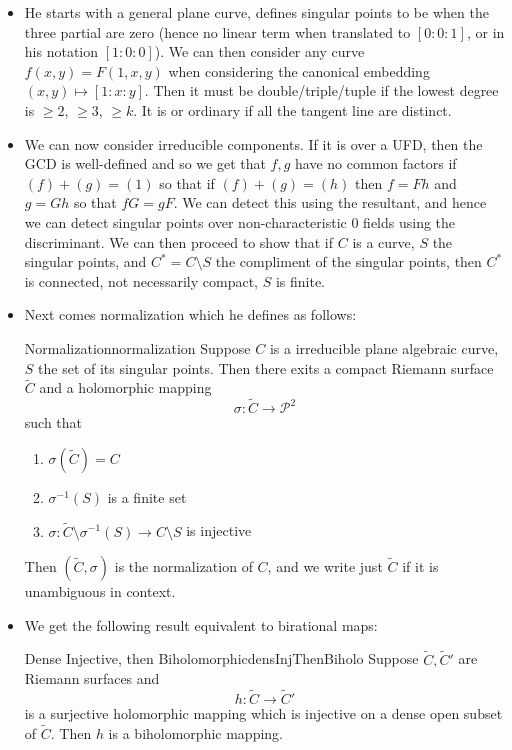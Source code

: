 \documentclass{book}
\newcommand{\CP}{{\mathcal{P}}}
\begin{document}
\begin{itemize}
  \item He starts with a general plane curve, defines singular points to be when the three partial are zero
    (hence no linear term when translated to $[0:0:1]$, or in his notation $[1:0:0]$). We can then consider
    any curve $f(x,y) = F(1,x,y)$ when considering the canonical embedding $(x,y) \mapsto [1:x:y]$. Then it
    must be double/triple/tuple if the lowest degree is $\ge 2$, $\ge 3$, $\ge k$. It is or ordinary if all
    the tangent line are distinct.
    \item We can now consider irreducible components. If it is over a UFD, then the GCD is well-defined and so
      we get that $f,g$ have no common factors if $(f) + (g) = (1)$ so that if $(f) + (g) = (h)$ then $f = Fh$
      and $g = Gh$ so that $fG = gF$. We can detect this using the resultant, and hence we can detect singular
      points over non-characteristic $0$ fields using the discriminant. We can then proceed to show that if
      $C$ is a curve, $S$ the singular points, and $C^* = C\setminus S$ the compliment of the singular points,
      then $C^*$ is connected, not necessarily compact, $S$ is finite.
      \item Next comes normalization which he defines as follows:
        \begin{defn}{Normalization}{normalization}
          Suppose $C$ is a irreducible plane algebraic curve, $S$ the set of its singular points. Then there
          exits a compact Riemann surface $\tilde{C}$ and a holomorphic mapping
          \[
            \sigma: \tilde{C} \to \CP^2
          \]
          such that
          \begin{enumerate}
            \item $\sigma(\tilde{C}) = C$
            \item $\sigma^{-1}(S)$ is a finite set
            \item $\sigma: \tilde{C}\setminus \sigma^{-1}(S) \to C\setminus S$ is injective
          \end{enumerate}
          Then $(\tilde{C}, \sigma)$ is the normalization of $C$, and we write just $\tilde{C}$ if it is
          unambiguous in context.
        \end{defn}
      \item We get the following result equivalent to birational maps:
        \begin{lem}{Dense Injective, then Biholomorphic}{densInjThenBiholo}
          Suppose $\tilde{C}, \tilde{C}'$ are Riemann surfaces and
          \[
            h: \tilde{C} \to \tilde{C}'
          \]
          is a surjective holomorphic mapping which is injective on a dense open subset of $\tilde{C}$. Then
          $h$ is a biholomorphic mapping.
        \end{lem}


\end{itemize}
\end{document}
